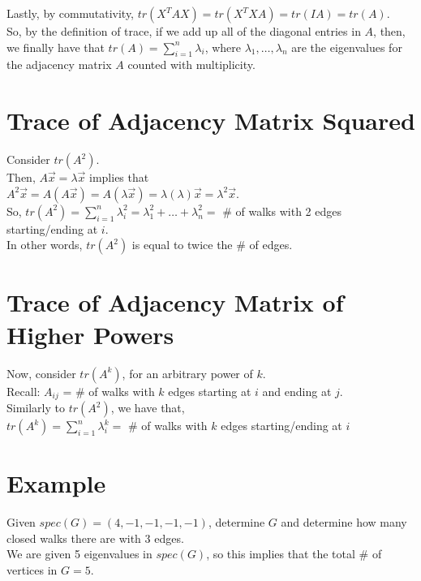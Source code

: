 \documentclass{article}
\begin{document}
Lastly, by commutativity, $tr(X^TAX) = tr(X^TXA) = tr(IA) = tr(A)$. \\

So, by the definition of trace, if we add up all of the diagonal entries in $A$, then, we finally have that $tr(A) = \sum^n_{i=1} \lambda_i$, where $\lambda_1, \ldots, \lambda_n$ are the eigenvalues for the adjacency matrix $A$ counted with multiplicity.

\section{Trace of Adjacency Matrix Squared}
Consider $tr(A^2)$. \\

Then, $A\vec{x} = \lambda\vec{x}$ implies that \\

$A^2\vec{x} = A(A\vec{x}) = A(\lambda\vec{x}) = \lambda(\lambda)\vec{x} = \lambda^2\vec{x}$. \\

So, $tr(A^2) = \sum^n_{i=1} \lambda^2_i = \lambda^2_1 + \ldots + \lambda^2_n = $ \# of walks with 2 edges starting/ending at $i$. \\

In other words, $tr(A^2)$ is equal to twice the \# of edges. 

\section{Trace of Adjacency Matrix of Higher Powers}
Now, consider $tr(A^k)$, for an arbitrary power of $k$. \\

Recall: $A_{ij}$ = \# of walks with $k$ edges starting at $i$ and ending at $j$. \\

Similarly to $tr(A^2)$, we have that, \\

$tr(A^k) = \sum^n_{i=1} \lambda^k_i = $ \# of walks with $k$ edges starting/ending at $i$

\section{Example}
Given $spec(G) = (4,-1,-1,-1,-1)$, determine $G$ and determine how many closed walks there are with 3 edges. \\

We are given 5 eigenvalues in $spec(G)$, so this implies that the total \# of vertices in $G = 5$. \\
\end{document}
